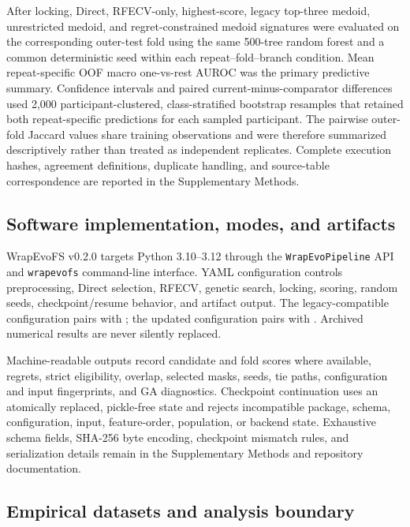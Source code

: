 After locking, Direct, RFECV-only, highest-score, legacy top-three medoid, unrestricted medoid, and regret-constrained medoid signatures were evaluated on the corresponding outer-test fold using the same 500-tree random forest and a common deterministic seed within each repeat--fold--branch condition. Mean repeat-specific OOF macro one-vs-rest AUROC was the primary predictive summary. Confidence intervals and paired current-minus-comparator differences used 2,000 participant-clustered, class-stratified bootstrap resamples that retained both repeat-specific predictions for each sampled participant. The pairwise outer-fold Jaccard values share training observations and were therefore summarized descriptively rather than treated as independent replicates. Complete execution hashes, agreement definitions, duplicate handling, and source-table correspondence are reported in the Supplementary Methods.

\subsection{Software implementation, modes, and artifacts}

WrapEvoFS v0.2.0 targets Python 3.10--3.12 through the \texttt{WrapEvoPipeline} API and \texttt{wrapevofs} command-line interface. YAML configuration controls preprocessing, Direct selection, RFECV, genetic search, locking, scoring, random seeds, checkpoint/resume behavior, and artifact output. The legacy-compatible configuration pairs  with ; the updated configuration pairs  with . Archived numerical results are never silently replaced.

Machine-readable outputs record candidate and fold scores where available, regrets, strict eligibility, overlap, selected masks, seeds, tie paths, configuration and input fingerprints, and GA diagnostics. Checkpoint continuation uses an atomically replaced, pickle-free state and rejects incompatible package, schema, configuration, input, feature-order, population, or backend state. Exhaustive schema fields, SHA-256 byte encoding, checkpoint mismatch rules, and serialization details remain in the Supplementary Methods and repository documentation.

\subsection{Empirical datasets and analysis boundary}

